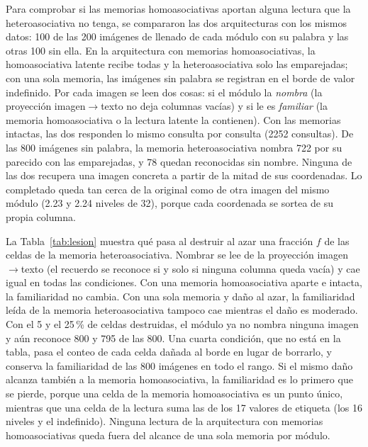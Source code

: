 Para comprobar si las memorias homoasociativas aportan alguna lectura que la
heteroasociativa no tenga, se compararon las dos arquitecturas con los mismos datos: 100
de las 200 imágenes de llenado de cada módulo con su palabra y las otras 100 sin ella.
En la arquitectura con memorias homoasociativas, la homoasociativa latente recibe todas
y la heteroasociativa solo las emparejadas; con una sola memoria, las imágenes sin
palabra se registran en el borde de valor indefinido. Por cada imagen se leen dos
cosas: si el módulo la \emph{nombra} (la proyección imagen$\to$texto no deja columnas
vacías) y si le es \emph{familiar} (la memoria homoasociativa o la lectura latente la
contienen).
Con las memorias intactas, las dos responden lo mismo consulta por consulta (2252
consultas). De las 800 imágenes sin palabra, la memoria heteroasociativa nombra 722 por
su parecido con las emparejadas, y 78 quedan reconocidas sin nombre.
Ninguna de las dos recupera una imagen concreta a partir de la mitad de sus
coordenadas. Lo completado queda tan cerca de la original como de otra imagen del mismo
módulo (2.23 y 2.24 niveles de 32), porque cada coordenada se sortea de su propia
columna.

La Tabla~\ref{tab:lesion} muestra qué pasa al destruir al azar una fracción $f$ de las
celdas de la memoria heteroasociativa.
Nombrar se lee de la proyección imagen$\to$texto (el recuerdo se reconoce si y solo si
ninguna columna queda vacía) y cae igual en todas las condiciones.
Con una memoria homoasociativa aparte e intacta, la familiaridad no cambia.
Con una sola memoria y daño al azar, la familiaridad leída de la memoria
heteroasociativa tampoco cae mientras el daño es moderado.
Con el 5 y el 25\,\% de celdas destruidas, el módulo ya no nombra ninguna imagen y aún
reconoce 800 y 795 de las 800.
Una cuarta condición, que no está en la tabla, pasa el conteo de cada celda dañada al
borde en lugar de borrarlo, y conserva la familiaridad de las 800 imágenes en todo el
rango.
Si el mismo daño alcanza también a la memoria homoasociativa, la familiaridad es lo
primero que se pierde, porque una celda de la memoria homoasociativa es un punto único,
mientras que una celda de la lectura suma las de los 17 valores de etiqueta (los 16
niveles y el indefinido).
Ninguna lectura de la arquitectura con memorias homoasociativas queda fuera del alcance
de una sola memoria por módulo.

